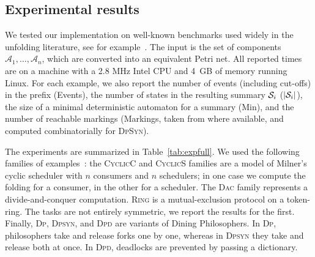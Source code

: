 \documentclass{llncs}
\def\A{\mathcal{A}}
\def\S{\mathcal{S}}
\renewcommand{\S}{{\cal S}}
\begin{document}
\subsection{Experimental results}


We tested our implementation on well-known benchmarks
used widely in the unfolding literature,
see for example~\cite{Cor96,Esparza96,Khomenko03}.
The input is the set of components $\A_1, \ldots, \A_n$,
which are converted into an equivalent Petri net. 
All reported times are on a machine with a 2.8 MHz Intel CPU and
4~GB of memory running Linux.
For each example, we
also report the number of events
(including cut-offs) in the prefix (Events),
the number of states
in the resulting summary $\S_i$ ($|\S_i|$), the size of a minimal deterministic
automaton for a summary (Min), and
the number of reachable
markings (Markings, taken from \cite{RoemerPhd} where
available, and computed combinatorially for \textsc{DpSyn}).


The experiments are summarized in Table~\ref{tab:expfull}. We used
the following families of examples~\cite{Cor96}:
the \textsc{CyclicC} and \textsc{CyclicS} families are a model of
Milner's cyclic scheduler with $n$ consumers and $n$ schedulers; in
one case we compute the folding for a consumer, in the other for a scheduler.
The \textsc{Dac} family represents a divide-and-conquer computation.
\textsc{Ring} is a mutual-exclusion protocol on a token-ring. The tasks
are not entirely symmetric, we report the results for the first.
Finally, \textsc{Dp}, \textsc{Dpsyn}, and \textsc{Dpd} are variants of
Dining Philosophers. In \textsc{Dp},
philosophers take and release forks one by one, whereas in \textsc{Dpsyn}
they take and release both at once. In \textsc{Dpd}, 
deadlocks are prevented by passing a dictionary.
\end{document}

